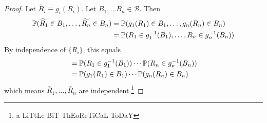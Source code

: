 \begin{proof}
    Let $\widetilde{R_i} \equiv g_i(R_i)$. Let $B_1, \ldots B_n \in \mathcal{B}$. Then
    \begin{align}
        \mathbb{P}(\widetilde{R_1} \in B_1, \ldots, \widetilde{R_n} \in B_n) &= \mathbb{P}(g_1(R_1) \in B_1, \ldots, g_n(R_n) \in B_n)\\
        &= \mathbb{P}(R_1 \in g_1^{-1}(B_1), \ldots, R_n \in g_n^{-1}(B_n))
    \end{align}
    By independence of $\{ R_i \}$, this equals
    \begin{align}
        &= \mathbb{P}(R_1 \in g_1^{-1}(B_1)) \cdots \mathbb{P}(R_n \in g_n^{-1}(B_n))\\
        &= \mathbb{P}(g_1(R_1) \in B_1) \cdots \mathbb{P}(g_n(R_n) \in B_n)
    \end{align}
    which means $\widetilde{R_1}, \ldots, \widetilde{R_n}$ are independent.\footnote{a LiTtLe BiT ThEoReTiCaL ToDaY}
\end{proof}
